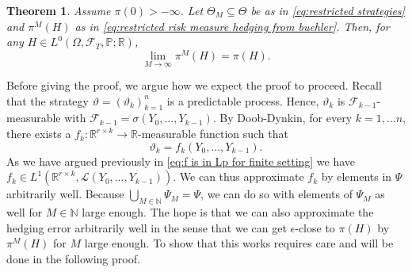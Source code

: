 \documentclass[11pt,a4paper,twoside,openany]{report}
\numberwithin{equation}{section}
\theoremstyle{plain} %
\newtheorem{theorem}{Theorem}[section]
\theoremstyle{definition} %
\theoremstyle{remark} %
\begin{document}
\begin{theorem}\label{thm:approximation by restricted hedging errors}
Assume \(\pi(0)>-\infty\).
 Let \(\Theta_M\subseteq \Theta\) be as in \eqref{eq:restricted strategies} and \(\pi^M(H)\) as in \eqref{eq:restricted risk measure hedging from buehler}. Then, for any \(H\in L^0(\Omega,\mathcal{F}_T,\mathbb{P};\mathbb{R})\),
 \begin{equation*}
     \lim_{M\to\infty}\pi^M(H)=\pi(H).
 \end{equation*}
\end{theorem}
Before giving the proof, we argue how we expect the proof to proceed. Recall that the strategy \(\vartheta=(\vartheta_k)_{k=1}^n\) is a predictable process. Hence, \(\vartheta_k\) is \(\mathcal{F}_{k-1}\)-measurable with \newline \(\mathcal{F}_{k-1}=\sigma(Y_0,\dots,Y_{k-1})\). By Doob-Dynkin, for every \(k=1,\dots n\), there exists a \newline\(f_k:\mathbb{R}^{r\times k}\to\mathbb{R}\)-measurable function such that
\begin{equation*}
    \vartheta_k=f_k(Y_0,\dots,Y_{k-1}).
\end{equation*}
As we have argued previously in \eqref{eq:f is in Lp for finite setting} we have \(f_k\in L^1(\mathbb{R}^{r\times k},\mathcal{L}(Y_0,\dots,Y_{k-1}))\). We can thus approximate \(f_k\) by elements in \(\Psi\) arbitrarily well. Because \(\bigcup_{M\in\mathbb{N}}\Psi_M=\Psi\), we can do so with elements of \(\Psi_M\) as well for \(M\in\mathbb{N}\) large enough. The hope is that we can also approximate the hedging error arbitrarily well in the sense that we can get \(\epsilon\)-close to \(\pi(H)\) by \(\pi^M(H)\) for \(M\) large enough. To show that this works requires care and will be done in the following proof.
\end{document}
